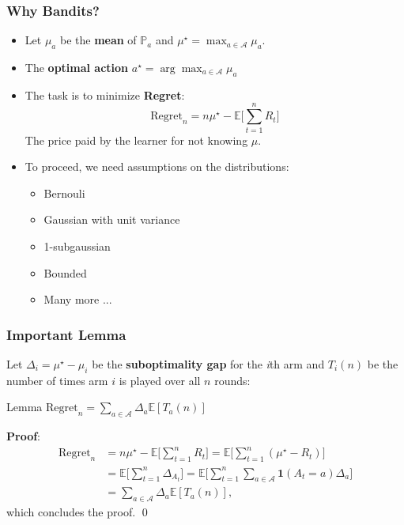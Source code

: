 \documentclass[usenames,dvipsnames, 10pt]{beamer}
\newcommand{\cA}{\mathcal{A}}
\newcommand{\Prob}{\mathbb{P}}
\newcommand{\E}{\mathbb{E}}
\begin{document}
\begin{frame}
	\frametitle{Why Bandits?}
	
	\begin{itemize}
		\item Let $\mu_a$ be the \textbf{mean} of $\Prob_a$ and $\mu^\star = \max_{a\in\cA} \mu_a$.
		
		\vspace{0.3cm}
		
		\item The \textbf{optimal action} $a^\star = \arg\max_{a\in\cA} \mu_a$
		
		\vspace{0.3cm}
		
		\item The task is to minimize \textbf{Regret}: 
		\begin{equation*}
			\text{Regret}_n = n\mu^\star - \E\Big[\sum_{t = 1}^{n} R_t\Big]
		\end{equation*}
		The price paid by the learner for not knowing $\mu$.
		\vspace{0.3cm}
		
		\item To proceed, we need assumptions on the distributions:
		\begin{itemize}
			\item Bernouli
			\item Gaussian with unit variance
			\item 1-subgaussian
			\item Bounded
			\item Many more ...
		\end{itemize}
	\end{itemize}	
\end{frame}	


\begin{frame}
	\frametitle{Important Lemma}
	Let $\Delta_i = \mu^\star - \mu_i$ be the \textbf{suboptimality gap} for the \textit{i}th arm and $T_i(n)$ be the number of times arm $i$ is played over all $n$ rounds:
	\begin{block}{Lemma}
		$\text{Regret}_n = \sum_{a \in \cA} \Delta_a \E[T_a(n)]$
	\end{block}
	\textbf{Proof}:
	\begin{align*}
		\text{Regret}_n &= n\mu^\star  - \E\Big[\sum_{t = 1}^{n}R_t\Big] 
		= \E\Big[\sum_{t = 1}^{n}(\mu^\star - R_t)\Big]\\
		&= \E\Big[\sum_{t = 1}^{n}\Delta_{A_t}\Big] = \E\Big[\sum_{t = 1}^{n}\sum_{a \in \cA}\mathbf{1}(A_t = a)\Delta_{a}\Big]\\
		&= \sum_{a \in \cA}\Delta_a \E[T_a(n)],
	\end{align*}
	which concludes the proof. \qed
\end{frame}
\end{document}
